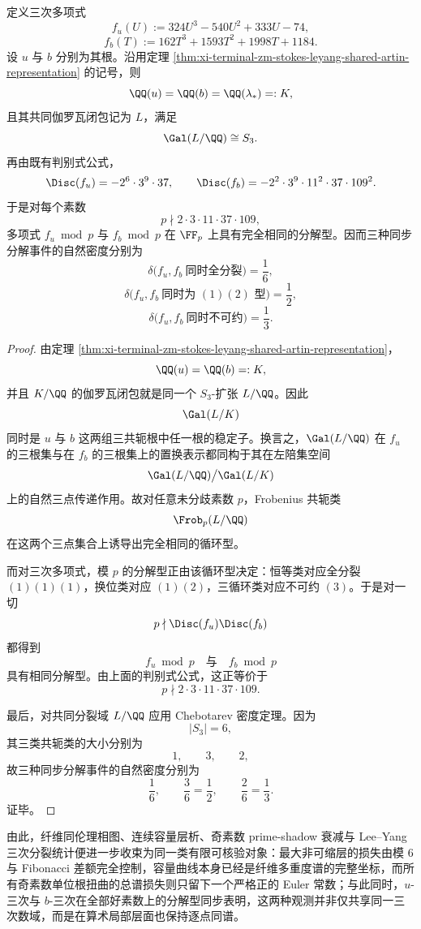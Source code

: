 \begin{theorem}\label{thm:xi-time-part62df-leyang-u-b-splitting-synchrony}
定义三次多项式
\[
f_u(U):=324U^3-540U^2+333U-74,
\]
\[
f_b(T):=162T^3+1593T^2+1998T+1184.
\]
设 \(u\) 与 \(b\) 分别为其根。沿用定理 \ref{thm:xi-terminal-zm-stokes-leyang-shared-artin-representation} 的记号，则
\[
\QQ(u)=\QQ(b)=\QQ(\lambda_*)=:K,
\]
且其共同伽罗瓦闭包记为 \(L\)，满足
\[
\Gal(L/\QQ)\cong S_3.
\]
再由既有判别式公式，
\[
\Disc(f_u)=-2^6\cdot 3^9\cdot 37,
\qquad
\Disc(f_b)=-2^2\cdot 3^9\cdot 11^2\cdot 37\cdot 109^2.
\]
于是对每个素数
\[
p\nmid 2\cdot 3\cdot 11\cdot 37\cdot 109,
\]
多项式 \(f_u\bmod p\) 与 \(f_b\bmod p\) 在 \(\FF_p\) 上具有完全相同的分解型。因而三种同步分解事件的自然密度分别为
\[
\delta\bigl(f_u,f_b\ \text{同时全分裂}\bigr)=\frac16,
\]
\[
\delta\bigl(f_u,f_b\ \text{同时为 }(1)(2)\text{ 型}\bigr)=\frac12,
\]
\[
\delta\bigl(f_u,f_b\ \text{同时不可约}\bigr)=\frac13.
\]
\end{theorem}
\begin{proof}
由定理 \ref{thm:xi-terminal-zm-stokes-leyang-shared-artin-representation}，
\[
\QQ(u)=\QQ(b)=:K,
\]
并且 \(K/\QQ\) 的伽罗瓦闭包就是同一个 \(S_3\)-扩张 \(L/\QQ\)。因此
\[
\Gal(L/K)
\]
同时是 \(u\) 与 \(b\) 这两组三共轭根中任一根的稳定子。换言之，\(\Gal(L/\QQ)\) 在 \(f_u\) 的三根集与在 \(f_b\) 的三根集上的置换表示都同构于其在左陪集空间
\[
\Gal(L/\QQ)\big/\Gal(L/K)
\]
上的自然三点传递作用。故对任意未分歧素数 \(p\)，Frobenius 共轭类
\[
\Frob_p(L/\QQ)
\]
在这两个三点集合上诱导出完全相同的循环型。

而对三次多项式，模 \(p\) 的分解型正由该循环型决定：恒等类对应全分裂 \((1)(1)(1)\)，换位类对应 \((1)(2)\)，三循环类对应不可约 \((3)\)。于是对一切
\[
p\nmid \Disc(f_u)\Disc(f_b)
\]
都得到
\[
f_u\bmod p
\quad\text{与}\quad
f_b\bmod p
\]
具有相同分解型。由上面的判别式公式，这正等价于
\[
p\nmid 2\cdot 3\cdot 11\cdot 37\cdot 109.
\]

最后，对共同分裂域 \(L/\QQ\) 应用 Chebotarev 密度定理。因为
\[
|S_3|=6,
\]
其三类共轭类的大小分别为
\[
1,\qquad 3,\qquad 2,
\]
故三种同步分解事件的自然密度分别为
\[
\frac{1}{6},\qquad \frac{3}{6}=\frac12,\qquad \frac{2}{6}=\frac13.
\]
证毕。
\end{proof}

\noindent
由此，纤维同伦理相图、连续容量层析、奇素数 prime-shadow 衰减与 Lee--Yang 三次分裂统计便进一步收束为同一类有限可核验对象：最大非可缩层的损失由模 \(6\) 与 Fibonacci 差额完全控制，容量曲线本身已经是纤维多重度谱的完整坐标，而所有奇素数单位根扭曲的总谱损失则只留下一个严格正的 Euler 常数；与此同时，\(u\)-三次与 \(b\)-三次在全部好素数上的分解型同步表明，这两种观测并非仅共享同一三次数域，而是在算术局部层面也保持逐点同谱。

\endinput
